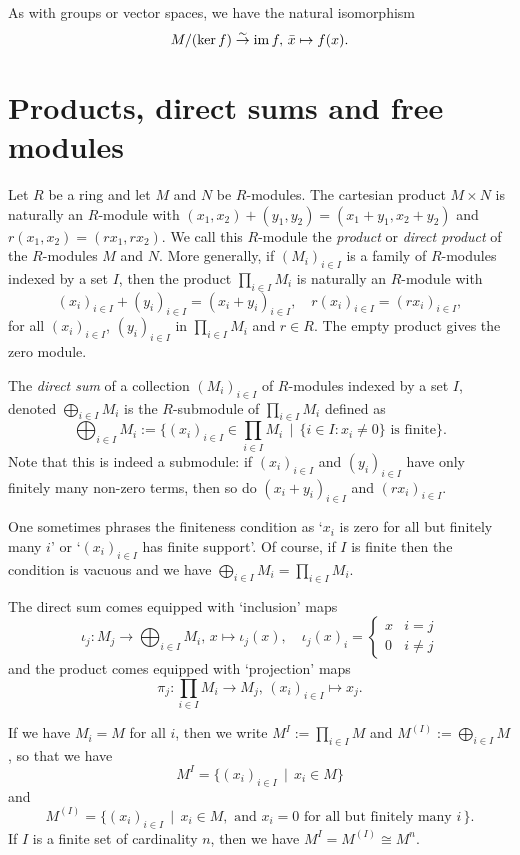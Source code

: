 As with groups or vector spaces, we have the natural isomorphism
\[
	M/(\ker f) \overset{\sim}{\to} \operatorname{im} f,\, \bar{x} \mapsto f(x).
\]

\section{Products, direct sums and free modules}\label{sec:products-and-direct-sums}

Let $R$ be a ring and let $M$ and $N$ be $R$-modules. The cartesian product $M\times N$ is naturally an $R$-module with $(x_1,x_2)+(y_1,y_2)=(x_1+y_1,x_2+y_2)$ and $r(x_1,x_2)=(rx_1,rx_2)$. We call this $R$-module the \emph{product} or \emph{direct product} of the $R$-modules $M$ and $N$.  More generally, if $(M_i)_{i\in I}$ is a family of $R$-modules indexed by a set $I$, then the product $\prod_{i\in I} M_i$ is naturally an $R$-module with
\[
	(x_i)_{i\in I} + (y_i)_{i\in I} = (x_i+y_i)_{i\in I},\quad r(x_i)_{i\in I} = (rx_i)_{i \in I},
\]
for all $(x_i)_{i\in I}$,  $(y_i)_{i\in I}$ in $\prod_{i\in I} M_i$ and $r\in R$. The empty product gives the zero module.  

The \emph{direct sum} of a collection $(M_i)_{i\in I}$ of $R$-modules indexed by a set $I$, denoted $\bigoplus_{i\in I} M_i$ is the $R$-submodule of $\prod_{i\in I} M_i$ defined as
\[
	\bigoplus_{i\in I} M_i := \Big\{ (x_i)_{i\in I} \in \prod_{i\in I} M_i \,\mid\,
	\{i\in I \colon x_i\neq 0\} \text{ is finite}\Big\}.
\]
Note that this is indeed a submodule: if $(x_i)_{i\in I}$ and $(y_i)_{i\in I}$  have only finitely many non-zero terms, then so do $(x_i+y_i)_{i\in I}$ and $(rx_i)_{i\in I}$.  

One sometimes phrases the finiteness condition as  `$x_i$ is zero for all but finitely many $i$' or `$(x_i)_{i\in I}$ has finite support'. Of course, if $I$ is finite then the condition is vacuous and we have $\bigoplus_{i\in I} M_i = \prod_{i\in I} M_i$.

The direct sum comes equipped with `inclusion' maps
\[
	\iota_j\colon M_j \to \bigoplus_{i\in I} M_i,\, x \mapsto \iota_j(x),\quad
	\iota_j(x)_i = \begin{cases} x & i=j \\ 0 & i\neq j \end{cases}
\]
and the product comes equipped with `projection' maps
\[
	\pi_j\colon  \prod_{i\in I} M_i \to M_j,\, (x_i)_{i\in I} \mapsto x_j.
\]


If we have $M_i=M$ for all $i$, then we write $M^I := \prod_{i\in I} M$ and $M^{(I)} := \bigoplus_{i\in I} M$,
so that we have
\[
	M^{I} = \{ (x_i )_{i\in I} \,\mid\, x_i \in M \}
\]
and
\[
	M^{(I)} = \big\{ (x_i)_{i\in I} \,\mid\, x_i \in M, \text{ and $x_i=0$ for all but  finitely many $i$}\, \big\}.
\]
If $I$ is a finite set of cardinality $n$, then we have $M^{I} = M^{(I)} \cong M^n$.



